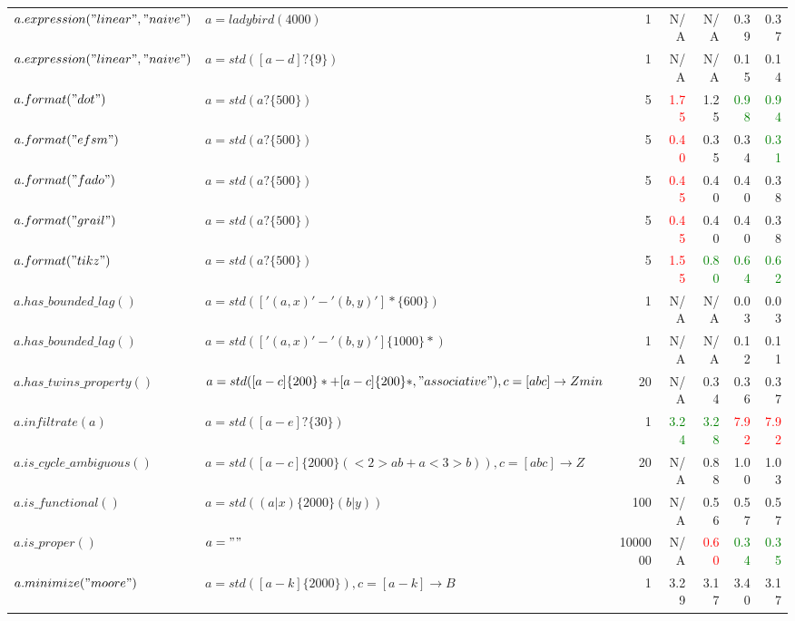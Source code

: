 \begin{tabular}{llr *{4}{r}}
$a.expression("linear", "naive")$ & $a = ladybird(4000)$ & 1 &   N/A &   N/A & \num{ 0.39} & \num{ 0.37} \\
$a.expression("linear", "naive")$ & $a = std([a-d]?\{9\})$ & 1 &   N/A &   N/A & \num{ 0.15} & \num{ 0.14} \\
$a.format("dot")$ & $a = std(a?\{500\})$ & 5 & \textcolor{red}{\num{ 1.75}} & \num{ 1.25} & \textcolor{green}{\num{ 0.98}} & \textcolor{green}{\num{ 0.94}} \\
$a.format("efsm")$ & $a = std(a?\{500\})$ & 5 & \textcolor{red}{\num{ 0.40}} & \num{ 0.35} & \num{ 0.34} & \textcolor{green}{\num{ 0.31}} \\
$a.format("fado")$ & $a = std(a?\{500\})$ & 5 & \textcolor{red}{\num{ 0.45}} & \num{ 0.40} & \num{ 0.40} & \num{ 0.38} \\
$a.format("grail")$ & $a = std(a?\{500\})$ & 5 & \textcolor{red}{\num{ 0.45}} & \num{ 0.40} & \num{ 0.40} & \num{ 0.38} \\
$a.format("tikz")$ & $a = std(a?\{500\})$ & 5 & \textcolor{red}{\num{ 1.55}} & \textcolor{green}{\num{ 0.80}} & \textcolor{green}{\num{ 0.64}} & \textcolor{green}{\num{ 0.62}} \\
$a.has\_bounded\_lag()$ & $a = std(['(a,x)'-'(b,y)']*\{600\})$ & 1 &   N/A &   N/A & \num{ 0.03} & \num{ 0.03} \\
$a.has\_bounded\_lag()$ & $a = std(['(a,x)'-'(b,y)']\{1000\}*)$ & 1 &   N/A &   N/A & \num{ 0.12} & \num{ 0.11} \\
$a.has\_twins\_property()$ & $a = std([a-c]\{200\}*+[a-c]\{200\}*, "associative"), c = [abc] \rightarrow Zmin$ & 20 &   N/A & \num{ 0.34} & \num{ 0.36} & \num{ 0.37} \\
$a.infiltrate(a)$ & $a = std([a-e]?\{30\})$ & 1 & \textcolor{green}{\num{ 3.24}} & \textcolor{green}{\num{ 3.28}} & \textcolor{red}{\num{ 7.92}} & \textcolor{red}{\num{ 7.92}} \\
$a.is\_cycle\_ambiguous()$ & $a = std([a-c]\{2000\}(<2>ab+a<3>b)), c = [abc] \rightarrow Z$ & 20 &   N/A & \num{ 0.88} & \num{ 1.00} & \num{ 1.03} \\
$a.is\_functional()$ & $a = std((a|x)\{2000\}(b|y))$ & 100 &   N/A & \num{ 0.56} & \num{ 0.57} & \num{ 0.57} \\
$a.is\_proper()$ & $a = ""$ & 1000000 &   N/A & \textcolor{red}{\num{ 0.60}} & \textcolor{green}{\num{ 0.34}} & \textcolor{green}{\num{ 0.35}} \\
$a.minimize("moore")$ & $a = std([a-k]\{2000\}), c = [a-k] \rightarrow B$ & 1 & \num{ 3.29} & \num{ 3.17} & \num{ 3.40} & \num{ 3.17} \\

\end{tabular}
